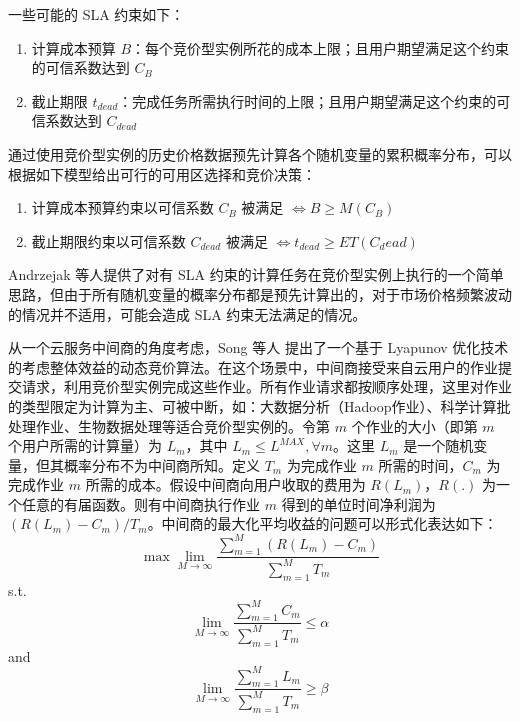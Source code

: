 一些可能的 SLA 约束如下：
\begin{enumerate}
\item 计算成本预算 $B$：每个竞价型实例所花的成本上限；且用户期望满足这个约束的可信系数达到 $C_B$
\item 截止期限 $t_{dead}$：完成任务所需执行时间的上限；且用户期望满足这个约束的可信系数达到 $C_{dead}$
\end{enumerate}

通过使用竞价型实例的历史价格数据预先计算各个随机变量的累积概率分布，可以根据如下模型给出可行的可用区选择和竞价决策：
\begin{enumerate}
\item 计算成本预算约束以可信系数 $C_B$ 被满足 $\iff B \geq M(C_B)$
\item 截止期限约束以可信系数 $C_{dead}$ 被满足 $\iff t_{dead} \geq ET(C_dead)$
\end{enumerate}

Andrzejak 等人提供了对有 SLA 约束的计算任务在竞价型实例上执行的一个简单思路，但由于所有随机变量的概率分布都是预先计算出的，对于市场价格频繁波动的情况并不适用，可能会造成 SLA 约束无法满足的情况。

从一个云服务中间商的角度考虑，Song 等人 \cite{song2012optimal} 提出了一个基于 Lyapunov 优化技术的考虑整体效益的动态竞价算法。在这个场景中，中间商接受来自云用户的作业提交请求，利用竞价型实例完成这些作业。所有作业请求都按顺序处理，这里对作业的类型限定为计算为主、可被中断，如：大数据分析（Hadoop作业）、科学计算批处理作业、生物数据处理等适合竞价型实例的。令第 $m$ 个作业的大小（即第 $m$ 个用户所需的计算量）为 $L_m$，其中 $L_m \leq L^{MAX}, \forall m$。这里 $L_m$ 是一个随机变量，但其概率分布不为中间商所知。定义 $T_m$ 为完成作业 $m$ 所需的时间，$C_m$ 为完成作业 $m$ 所需的成本。假设中间商向用户收取的费用为 $R(L_m)$，$R(.)$ 为一个任意的有届函数。则有中间商执行作业 $m$ 得到的单位时间净利润为 $(R(L_m) - C_m)/T_m$。中间商的最大化平均收益的问题可以形式化表达如下：
\begin{equation}\nonumber 
\max \lim_{M \rightarrow \infty}{\frac{\sum_{m=1}^M(R(L_m)-C_m)}{\sum_{m=1}^MT_m}}  
\end{equation}
s.t.
\begin{equation}\nonumber 
\lim_{M \rightarrow \infty}{\frac{\sum_{m=1}^MC_m}{\sum_{m=1}^MT_m}} \leq \alpha 
\end{equation}
and
\begin{equation}\nonumber 
\lim_{M \rightarrow \infty}{\frac{\sum_{m=1}^ML_m}{\sum_{m=1}^MT_m}} \geq \beta 
\end{equation}

